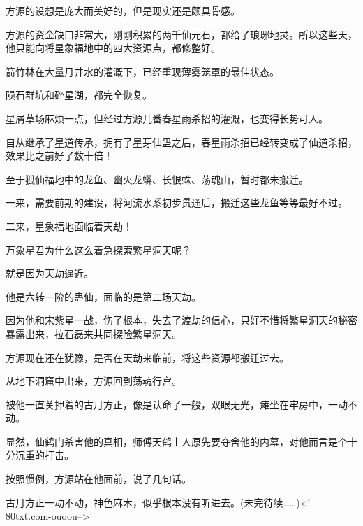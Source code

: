 \begin{this_body}
方源的设想是庞大而美好的，但是现实还是颇具骨感。

方源的资金缺口非常大，刚刚积累的两千仙元石，都给了琅琊地灵。所以这些天，他只能向将星象福地中的四大资源点，都修整好。

箭竹林在大量月井水的灌溉下，已经重现薄雾笼罩的最佳状态。

陨石群坑和碎星湖，都完全恢复。

星屑草场麻烦一点，但经过方源几番春星雨杀招的灌溉，也变得长势可人。

自从继承了星道传承，拥有了星芽仙蛊之后，春星雨杀招已经转变成了仙道杀招，效果比之前好了数十倍！

至于狐仙福地中的龙鱼、幽火龙蟒、长恨蛛、荡魂山，暂时都未搬迁。

一来，需要前期的建设，将河流水系初步贯通后，搬迁这些龙鱼等等最好不过。

二来，星象福地面临着天劫！

万象星君为什么这么着急探索繁星洞天呢？

就是因为天劫逼近。

他是六转一阶的蛊仙，面临的是第二场天劫。

因为他和宋紫星一战，伤了根本，失去了渡劫的信心，只好不惜将繁星洞天的秘密暴露出来，拉石磊来共同探险繁星洞天。

方源现在还在犹豫，是否在天劫来临前，将这些资源都搬迁过去。

从地下洞窟中出来，方源回到荡魂行宫。

被他一直关押着的古月方正，像是认命了一般，双眼无光，瘫坐在牢房中，一动不动。

显然，仙鹤门杀害他的真相，师傅天鹤上人原先要夺舍他的内幕，对他而言是个十分沉重的打击。

按照惯例，方源站在他面前，说了几句话。

古月方正一动不动，神色麻木，似乎根本没有听进去。(未完待续……)<!--80txt.com-ouoou-->

\end{this_body}

